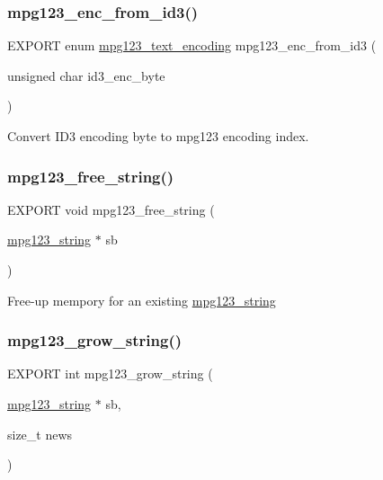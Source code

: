 \subsubsection{\texorpdfstring{mpg123\+\_\+enc\+\_\+from\+\_\+id3()}{mpg123\_enc\_from\_id3()}}
{\footnotesize\ttfamily E\+X\+P\+O\+RT enum \hyperlink{group__mpg123__metadata_ga489b4cd5fb8d1d826e38b09bed9294ce}{mpg123\+\_\+text\+\_\+encoding} mpg123\+\_\+enc\+\_\+from\+\_\+id3 (\begin{DoxyParamCaption}\item[{unsigned char}]{id3\+\_\+enc\+\_\+byte }\end{DoxyParamCaption})}

Convert I\+D3 encoding byte to mpg123 encoding index. \mbox{\label{group__mpg123__metadata_gaed35b9810bfd1703a3196d13f58e6da1}} 
\subsubsection{\texorpdfstring{mpg123\+\_\+free\+\_\+string()}{mpg123\_free\_string()}}
{\footnotesize\ttfamily E\+X\+P\+O\+RT void mpg123\+\_\+free\+\_\+string (\begin{DoxyParamCaption}\item[{\hyperlink{structmpg123__string}{mpg123\+\_\+string} $\ast$}]{sb }\end{DoxyParamCaption})}

Free-\/up mempory for an existing \hyperlink{structmpg123__string}{mpg123\+\_\+string} \mbox{\label{group__mpg123__metadata_gacba226b1faa6e697819fa72f645045dd}} 
\subsubsection{\texorpdfstring{mpg123\+\_\+grow\+\_\+string()}{mpg123\_grow\_string()}}
{\footnotesize\ttfamily E\+X\+P\+O\+RT int mpg123\+\_\+grow\+\_\+string (\begin{DoxyParamCaption}\item[{\hyperlink{structmpg123__string}{mpg123\+\_\+string} $\ast$}]{sb,  }\item[{size\+\_\+t}]{news }\end{DoxyParamCaption})}

